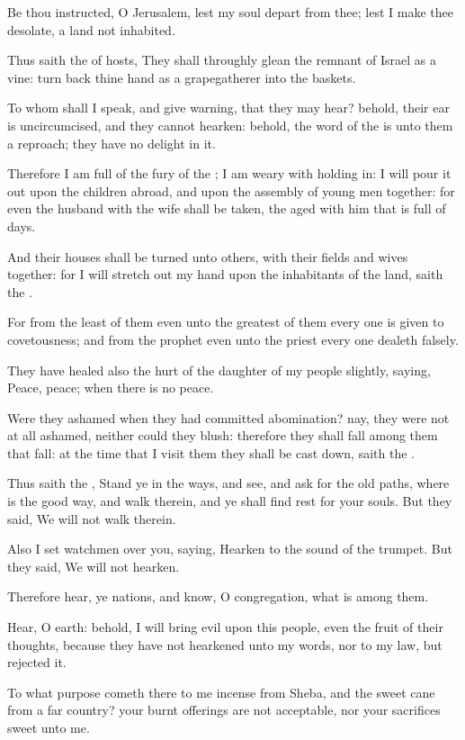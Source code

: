\verse Be thou instructed, O Jerusalem, lest my soul depart from thee; lest I make thee desolate, a land not inhabited.

\verse Thus saith the \LORD of hosts, They shall throughly glean the remnant of Israel as a vine: turn back thine hand as a grapegatherer into the baskets.

\verse To whom shall I speak, and give warning, that they may hear?  behold, their ear is uncircumcised, and they cannot hearken: behold, the word of the \LORD is unto them a reproach; they have no delight in it.

\verse Therefore I am full of the fury of the \LORD; I am weary with holding in: I will pour it out upon the children abroad, and upon the assembly of young men together: for even the husband with the wife shall be taken, the aged with him that is full of days.

\verse And their houses shall be turned unto others, with their fields and wives together: for I will stretch out my hand upon the inhabitants of the land, saith the \LORD.

\verse For from the least of them even unto the greatest of them every one is given to covetousness; and from the prophet even unto the priest every one dealeth falsely.

\verse They have healed also the hurt of the daughter of my people slightly, saying, Peace, peace; when there is no peace.

\verse Were they ashamed when they had committed abomination? nay, they were not at all ashamed, neither could they blush: therefore they shall fall among them that fall: at the time that I visit them they shall be cast down, saith the \LORD.

\verse Thus saith the \LORD, Stand ye in the ways, and see, and ask for the old paths, where is the good way, and walk therein, and ye shall find rest for your souls. But they said, We will not walk therein.

\verse Also I set watchmen over you, saying, Hearken to the sound of the trumpet. But they said, We will not hearken.

\verse Therefore hear, ye nations, and know, O congregation, what is among them.

\verse Hear, O earth: behold, I will bring evil upon this people, even the fruit of their thoughts, because they have not hearkened unto my words, nor to my law, but rejected it.

\verse To what purpose cometh there to me incense from Sheba, and the sweet cane from a far country? your burnt offerings are not acceptable, nor your sacrifices sweet unto me.

